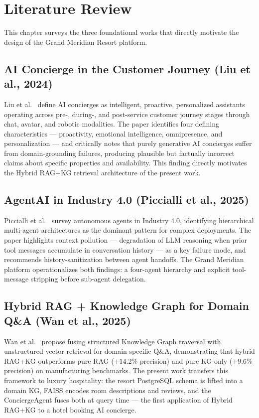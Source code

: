 \documentclass[11pt,a4paper]{report}
\begin{document}
\chapter{Literature Review}

This chapter surveys the three foundational works that directly motivate the design of the Grand Meridian Resort platform.

\section{AI Concierge in the Customer Journey (Liu et al., 2024)}

Liu et al.~\cite{liu2024aiconcierge} define AI concierges as intelligent, proactive, personalized assistants operating across pre-, during-, and post-service customer journey stages through chat, avatar, and robotic modalities. The paper identifies four defining characteristics — proactivity, emotional intelligence, omnipresence, and personalization — and critically notes that purely generative AI concierges suffer from domain-grounding failures, producing plausible but factually incorrect claims about specific properties and availability. This finding directly motivates the Hybrid RAG+KG retrieval architecture of the present work.

\section{AgentAI in Industry 4.0 (Piccialli et al., 2025)}

Piccialli et al.~\cite{piccialli2025agentai} survey autonomous agents in Industry 4.0, identifying hierarchical multi-agent architectures as the dominant pattern for complex deployments. The paper highlights context pollution — degradation of LLM reasoning when prior tool messages accumulate in conversation history — as a key failure mode, and recommends history-sanitization between agent handoffs. The Grand Meridian platform operationalizes both findings: a four-agent hierarchy and explicit tool-message stripping before sub-agent delegation.

\section{Hybrid RAG + Knowledge Graph for Domain Q\&A (Wan et al., 2025)}

Wan et al.~\cite{wan2025hybridrag} propose fusing structured Knowledge Graph traversal with unstructured vector retrieval for domain-specific Q\&A, demonstrating that hybrid RAG+KG outperforms pure RAG ($+14.2\%$ precision) and pure KG-only ($+9.6\%$ precision) on manufacturing benchmarks. The present work transfers this framework to luxury hospitality: the resort PostgreSQL schema is lifted into a domain KG, FAISS encodes room descriptions and reviews, and the ConciergeAgent fuses both at query time — the first application of Hybrid RAG+KG to a hotel booking AI concierge.
\end{document}
